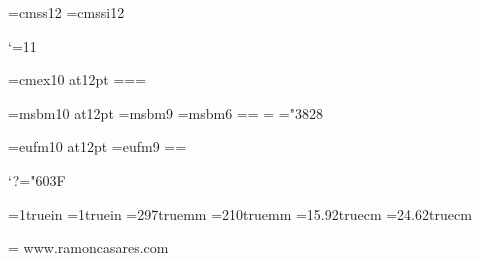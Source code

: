
\ifx\files\undefined  \fi

\files


\ifx\loadfont\undefined  \fi
\xiifonts \xiititles \rm
\let\bold=\xiibfonts \let\roman=\xiifonts
{}\utfon
\font\sf=cmss12
\font\sfit=cmssi12

\catcode`\@=11

\font\xiiex=cmex10 at12pt
=\xiiex {}=\xiiex {}=\xiiex

\font\xiibb=msbm10 at12pt
\font\ixbb=msbm9
\font\vibb=msbm6
\newfam\bbfam %
\textfont\bbfam=\xiibb \scriptfont\bbfam=\ixbb
\scriptscriptfont\bbfam=\vibb
\def\bb{\fam\bbfam\xiibb}
\mathchardef\subsetneq="3828

\font\xiifrak=eufm10 at12pt
\font\ixfrak=eufm9
\newfam\frakfam \textfont\frakfam=\xiifrak \scriptfont\frakfam=\ixfrak
\def\frak{\fam\frakfam\xiifrak}

\mathcode`?="603F %
\def\ifmath$#1${\relax\ifmmode #1\else$#1$\fi}
\def\QED{\ifmath$\diamond$}


\ifcase\pdfoutput
\else
 \pdfhorigin=1truein
 \pdfvorigin=1truein
 \pdfpageheight=297truemm
 \pdfpagewidth=210truemm
\fi
\hsize=15.92truecm \vsize=24.62truecm %
\advance\vsize -30pt

\def\twodigits#1{\ifnum #1<10 0\fi \number#1}
\def\todayiso{\number\year \twodigits\month \twodigits\day}
\let\version=\todayiso
\def\Folio{\ifnum\pageno<0
 \uppercase\expandafter{\romannumeral-\pageno}\else\number\pageno\fi}

\headline={\vrule height10.2pt depth4.2pt width0pt
 {\xiitt www.ramoncasares.com}\quad{\xiirm\version}\hfil
 \quad{\xiibf\jobname\quad\Folio}}%
\def\makeheadline{\vbox to 30pt{\colorblack\line{\the\headline}%
  \kern 1pt \hrule height 1pt\vfil\endcolor}\nointerlineskip}
\nopagenumbers


\def\cmykOrange{0 .7 .7 0} \def\cmykDarkOrange{0 .7 .7 .3}
\def\cmykPink{0 .5 0 0} \def\cmykDarkPink{0 .5 0 .3}


\newcount\secno
\newcount\ssecno
\newcount\thno
\newcount\parno
\let\presec=\empty
\def\presec{^^c2^^a7}%

